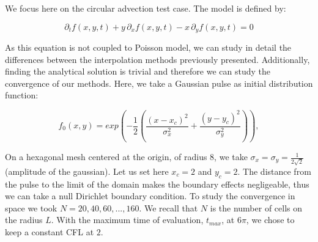 \documentclass[proc]{edpsmath}
\begin{document}
We focus here on the circular advection test case. The model is defined by:

	\begin{equation}
		\partial_t f(x,y,t) + y\,\partial_x f(x,y,t) - x \,\partial_y f(x,y,t) = 0 
	\end{equation}

As this equation is not coupled to Poisson model, we can study in detail the differences between the interpolation methods previously presented.	Additionally, finding the analytical solution is trivial and therefore we can study the convergence of our methods. Here, we take a Gaussian pulse as initial distribution function:

	\begin{equation}
	 f_0(x,y) = exp  \left( -\dfrac{1}{2} \left( \dfrac{(x - x_c)^2}{\sigma_x^2} + \dfrac{(y - y_c)^2}{\sigma_y^2  } \right)   \right ), 
	\end{equation}

On a hexagonal mesh centered at the origin, of radius $8$,  we take  $\sigma_x = \sigma_y = \frac{1}{2\sqrt{2}}$ (amplitude of the gaussian). Let us set here $x_c = 2$ and $y_c = 2$. The distance from the pulse to the limit of the domain makes the boundary effects negligeable, thus we can take a null Dirichlet boundary condition.  To study the convergence in space we took $N = 20, 40, 60, ..., 160$. We recall that $N$ is the number of cells on the radius $L$. With the maximum time of evaluation, $t_{max}$, at $6 \pi$, we chose to keep a constant CFL at $2$.
\end{document}
